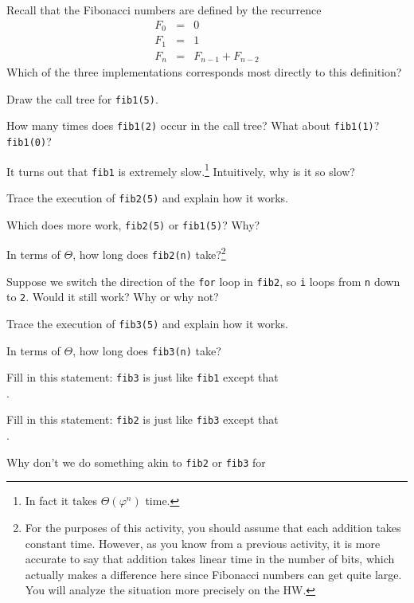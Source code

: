 \documentclass{tufte-handout}
\begin{document}
\begin{questions}
\item Recall that the Fibonacci numbers are defined by the recurrence
  \begin{align*}
    F_0 &=& 0 \\ F_1 &=& 1 \\ F_n &=& F_{n-1} + F_{n-2}
  \end{align*}
  Which of the three implementations corresponds most directly to
  this definition?
\item Draw the call tree for \verb|fib1(5)|. \vspace{1in}
\item How many times does \verb|fib1(2)| occur in the call tree?
  What about \verb|fib1(1)|?  \verb|fib1(0)|?
\item It turns out that \verb|fib1| is extremely slow.\footnote{In
    fact it takes $\Theta(\varphi^n)$ time.}  Intuitively, why is it
  so slow?
\item Trace the execution of \verb|fib2(5)| and explain how it works. \vspace{1in}
\item Which does more work, \verb|fib2(5)| or \verb|fib1(5)|?  Why?
\newpage
\item In terms of $\Theta$, how long does \verb|fib2(n)|
  take?\footnote{For the purposes of this activity, you should assume
    that each addition takes constant time.  However, as you know from
    a previous activity, it is more accurate to say that addition
    takes linear time in the number of bits, which actually makes a
    difference here since Fibonacci numbers can get quite large.  You
    will analyze the situation more precisely on the HW.}
\item Suppose we switch the direction of the \verb|for| loop in
  \verb|fib2|, so \verb|i| loops from \verb|n| down to \verb|2|.
  Would it still work?  Why or why not?
\item Trace the execution of \verb|fib3(5)| and explain how it works. \vspace{1in}
\item In terms of $\Theta$, how long does \verb|fib3(n)| take?
\item Fill in this statement: \verb|fib3| is just like \verb|fib1|
  except that \\ \blank.
\item Fill in this statement: \verb|fib2| is just like \verb|fib3|
  except that \\ \blank.
\item Why don't we do something akin to \verb|fib2| or \verb|fib3| for

\end{questions}
\end{document}
